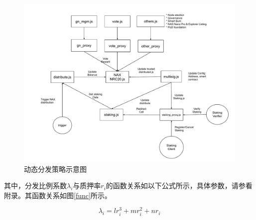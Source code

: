 \begin{figure}[htbp]
  \centering
    \includegraphics[width=1\textwidth]{../common/nax.pdf}
    \caption{动态分发策略示意图 \label{fig:dynamic_dist}}
\end{figure}

其中，分发比例系数\(\lambda_i\)与质押率\(r_i\)的函数关系如以下公式所示，具体参数，请参看附录。其函数关系如图\ref{func}所示。

  \begin{equation}
    \lambda_i = l r_i^3 + m r_i^2 + n r_i
  \end{equation}

